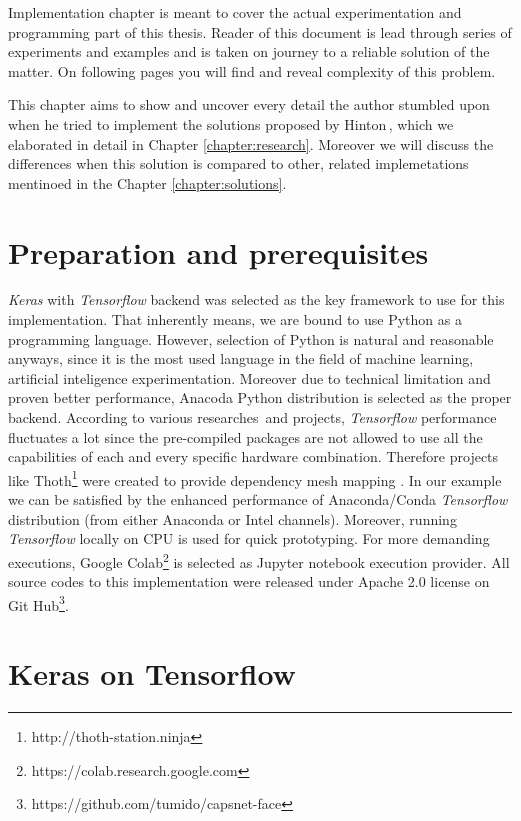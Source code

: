 Implementation chapter is meant to cover the actual experimentation and programming part of this thesis. Reader of this document is lead through series of experiments and examples and is taken on journey to a reliable solution of the matter. On following pages you will find and reveal complexity of this problem.

This chapter aims to show and uncover every detail the author stumbled upon when he tried to implement the solutions proposed by Hinton\,\cite{capsule}, which we elaborated in detail in Chapter \ref{chapter:research}. Moreover we will discuss the differences when this solution is compared to other, related implemetations mentinoed in the Chapter \ref{chapter:solutions}.

\section{Preparation and prerequisites}

\textit{Keras} with \textit{Tensorflow} backend was selected as the key framework to use for this implementation. That inherently means, we are bound to use Python as a programming language. However, selection of Python is natural and reasonable anyways, since it is the most used language in the field of machine learning, artificial inteligence experimentation. Moreover due to technical limitation and proven better performance, Anacoda Python distribution is selected as the proper backend. According to various researches\, and projects, \textit{Tensorflow} performance fluctuates a lot since the pre-compiled packages are not allowed to use all the capabilities of each and every specific hardware combination. Therefore projects like Thoth\footnote{http://thoth-station.ninja} were created to provide dependency mesh mapping . In our example we can be satisfied by the enhanced performance of Anaconda/Conda \textit{Tensorflow} distribution (from either Anaconda or Intel channels). Moreover, running \textit{Tensorflow} locally on CPU is used for quick prototyping. For more demanding executions, Google Colab\footnote{https://colab.research.google.com} is selected as Jupyter notebook execution provider. All source codes to this implementation were released under Apache 2.0 license on Git Hub\footnote{https://github.com/tumido/capsnet-face}.

\section{Keras on Tensorflow}

